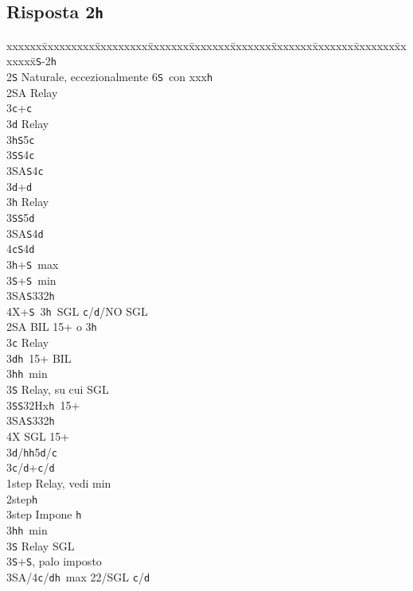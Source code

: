 \documentclass[a4paper,italian]{article}
\newcommand{\BS}{\small{\texttt{S}}}
\newcommand{\BC}{\small{\texttt{c}}}
\newcommand{\BD}{\small{\texttt{d}}}
\newcommand{\BH}{\small{\texttt{h}}}
\newcommand{\pdfh}{\texorpdfstring{\texttt{h}}{H}}
\newenvironment{bidtable}
{\begin{tabbing}

    xxxxxx\=xxxxxxxxx\=xxxxxxxxx\=xxxxxxx\=xxxxxxx\=xxxxxxx\=xxxxxxx\=xxxxxxx\=xxxxxxx\=xxxxxxx\=\kill}
{\end{tabbing} }%
\begin{document}
\begin{multicols}{2}

    \subsection{Risposta 2\pdfh}

    \begin{bidtable}
        1\BS-2\BH\+\\
        2\BS\> Naturale, eccezionalmente 6\BS\ con xxx\BH\+\\
        2\small{SA} \> Relay\+\\
        3\BC{}+\BC\+\\
        3\BD\> Relay\+\\
        3\BH{}\BS5\BC\\
        3\BS{}\BS4\BC\\
        3\small{SA}\BS4\BC\-\-\\
        3\BD{}+\BD\+\\
        3\BH\> Relay\+\\
        3\BS{}\BS5\BD\\
        3\small{SA}\BS4\BD\\
        4\BC{}\BS4\BD\-\-\\
        3\BH{}+\BS\ max\\
        3\BS{}+\BS\ min\\
        3\small{SA}\BS332\BH\\
        4X+\BS\ 3\BH\ SGL \BC/\BD/NO SGL\-\-\\
        2\small{SA}\> BIL 15+ o 3\BH\+\\
        3\BC\> Relay\+\\
        3\BD{}\BH\ 15+ BIL\\
        3\BH{}\BH\ min\+\\
        3\BS\> Relay, su cui SGL\-\\
        3\BS{}\BS32Hx\BH\ 15+\\
        3\small{SA}\BS332\BH\\
        4X\> SGL 15+\-\\
        3\BD/\BH{}\BH5\BD/\BC\-\\
        3\BC/\BD{}+\BC/\BD\+\\
        1step\> Relay, vedi min\\
        2step\BH\\
        3step\> Impone \BH\-\\
        3\BH{}\BH\ min\+\\
        3\BS\> Relay SGL\-\\
        3\BS{}+\BS, palo imposto\\
        3\small{SA}/4\BC/\BD\>\BH\ max 22/SGL \BC/\BD
    \end{bidtable}
    \vfill\null
    \columnbreak


\end{multicols}
\end{document}
